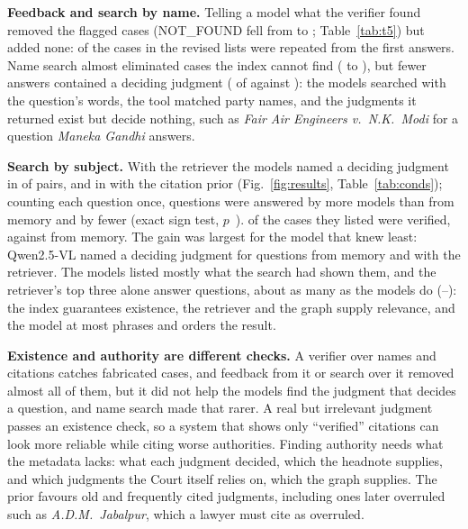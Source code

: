 \textbf{Feedback and search by name.} Telling a model what the verifier found removed the flagged cases (NOT\_FOUND fell from \TFiveNFBeforeAll{} to \TFiveNFAfterAll; Table~\ref{tab:t5}) but added none: \TFiveRepeatedAll{} of the \TFiveCasesAfterAll{} cases in the revised lists were repeated from the first answers. Name search almost eliminated cases the index cannot find (\NFClosedAll{} to \NFSearchAll), but fewer answers contained a deciding judgment (\RefSearchAll{} of \RefQuestionsAll{} against \RefClosedAll): the models searched with the question's words, the tool matched party names, and the judgments it returned exist but decide nothing, such as \emph{Fair Air Engineers v.\ N.K.\ Modi} for a question \emph{Maneka Gandhi} answers.

\textbf{Search by subject.} With the retriever the models named a deciding judgment in \RefAllTopic{} of \RefQuestionsAll{} pairs, and in \RefAllTopicPrior{} with the citation prior (Fig.~\ref{fig:results}, Table~\ref{tab:conds}); counting each question once, \SignClosedTopicPriorBetter{} questions were answered by more models than from memory and \SignClosedTopicPriorWorse{} by fewer (exact sign test, $p$~\SignClosedTopicPriorP). \VerPctAllTopicPrior{} of the \CasesAllTopicPrior{} cases they listed were verified, against \VerPctAllClosed{} from memory. The gain was largest for the model that knew least: Qwen2.5-VL named a deciding judgment for \RefClosedQwenVL{} questions from memory and \RefTopicPriorQwenVL{} with the retriever. The models listed mostly what the search had shown them, and the retriever's top three alone answer \QHybridPriorHitThree{} questions, about as many as the models do (\RefTopicPriorGemma--\RefTopicPriorLlama): the index guarantees existence, the retriever and the graph supply relevance, and the model at most phrases and orders the result.

\begin{table}[t]
\caption{Deciding judgments named and cases not found, by model and condition (\S\ref{sec:setup}). Ref.\ is the number of the \NumTopics{} questions for which a case that decided the question was named; N.F.\ is the number of listed cases the verifier could not find.}
\label{tab:conds}
\centering
\scriptsize
\setlength{\tabcolsep}{2pt}
\resizebox{\columnwidth}{!}{}
\end{table}

\textbf{Existence and authority are different checks.} A verifier over names and citations catches fabricated cases, and feedback from it or search over it removed almost all of them, but it did not help the models find the judgment that decides a question, and name search made that rarer. A real but irrelevant judgment passes an existence check, so a system that shows only ``verified'' citations can look more reliable while citing worse authorities. Finding authority needs what the metadata lacks: what each judgment decided, which the headnote supplies, and which judgments the Court itself relies on, which the graph supplies. The prior favours old and frequently cited judgments, including ones later overruled such as \emph{A.D.M.\ Jabalpur}, which a lawyer must cite as overruled.

